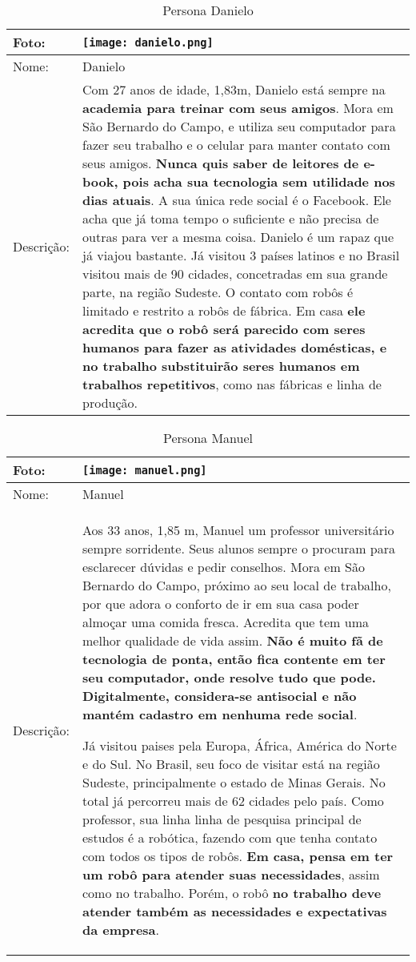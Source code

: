 \begin{table}[!ht]
	\caption{Persona Danielo}
	\label{tab:danielo}
	\centering
	\begin{tabular}{ m{2 cm} | m{13cm} }
		\hline
		Foto: & \rule{0cm}{2.7cm} \texttt{[image: danielo.png]} \\
		\hline
		Nome: & Danielo \\
		\hline
		Descrição: & Com 27 anos de idade, 1,83m, Danielo está sempre na \textbf{academia para treinar com seus amigos}. Mora em São Bernardo do Campo, e utiliza seu computador para fazer seu trabalho e o celular para manter contato com seus amigos. \textbf{Nunca quis saber de leitores de e-book, pois acha sua tecnologia sem utilidade nos dias atuais}. A sua única rede social é o Facebook. Ele acha que já toma tempo o suficiente e não precisa de outras para ver a mesma coisa. Danielo é um rapaz que já viajou bastante. Já visitou 3 países latinos e no Brasil visitou mais de 90 cidades, concetradas em sua grande parte, na região Sudeste. O contato com robôs é limitado e restrito a robôs de fábrica. Em casa \textbf{ele acredita que o robô será parecido com seres humanos para fazer as atividades domésticas, e no trabalho substituirão seres humanos em trabalhos repetitivos}, como nas fábricas e linha de produção.\\
		\hline
	\end{tabular}
\end{table}

\begin{table}[!ht]
	\caption{Persona Manuel}
	\label{tab:manuel}
	\centering
	\begin{tabular}{ m{2 cm} | m{13cm} }
		\hline
		Foto: & \rule{0cm}{2.7cm} \texttt{[image: manuel.png]} \\
		\hline
		Nome: & Manuel \\
		\hline
		Descrição: & Aos 33 anos, 1,85 m,  Manuel um professor universitário sempre sorridente. Seus alunos sempre o procuram para esclarecer dúvidas e pedir conselhos. Mora em São Bernardo do Campo, próximo ao seu local de trabalho, por que adora o conforto de ir em sua casa poder almoçar uma comida fresca. Acredita que tem uma melhor qualidade de vida assim. \textbf{Não é muito fã de tecnologia de ponta, então fica contente em ter seu computador, onde resolve tudo que pode. Digitalmente, considera-se antisocial e não mantém cadastro em nenhuma rede social}.

		Já visitou paises pela Europa, África, América do Norte e do Sul. No Brasil, seu foco de visitar está na região Sudeste, principalmente o estado de Minas Gerais. No total já percorreu mais de 62 cidades pelo país. Como professor, sua linha linha de pesquisa principal de estudos é a robótica, fazendo com que tenha contato com todos os tipos de robôs. \textbf{Em casa, pensa em ter um robô para atender suas necessidades}, assim como no trabalho. Porém, o robô \textbf{no trabalho deve atender também as necessidades e expectativas da empresa}.\\
		\hline
	\end{tabular}
\end{table}

